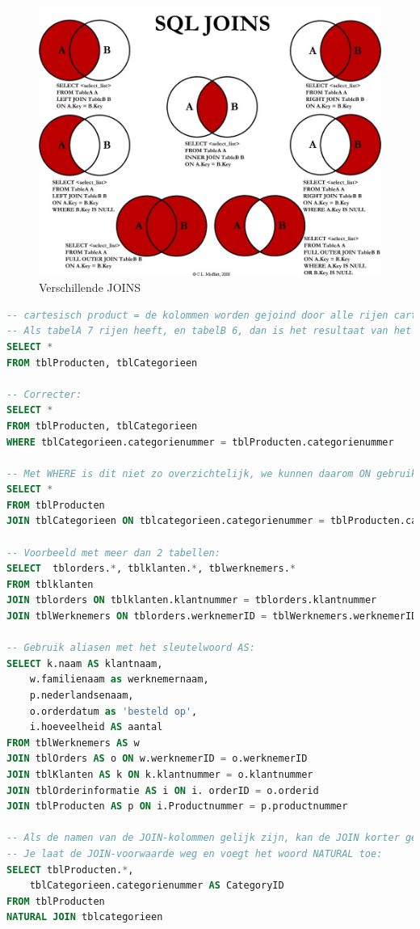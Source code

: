 \documentclass{article}
\begin{document}
\begin{figure}[H]
    \centering
    \includegraphics[width=\textwidth]{SQL Joins.jpg}
    \caption{Verschillende JOINS}
\end{figure}

\begin{lstlisting}[language=SQL]
-- cartesisch product = de kolommen worden gejoind door alle rijen cartesisch te combineren
-- Als tabelA 7 rijen heeft, en tabelB 6, dan is het resultaat van het cartesisch product 42 rijen (7*6):
SELECT *
FROM tblProducten, tblCategorieen 

-- Correcter:
SELECT *
FROM tblProducten, tblCategorieen
WHERE tblCategorieen.categorienummer = tblProducten.categorienummer

-- Met WHERE is dit niet zo overzichtelijk, we kunnen daarom ON gebruiken:
SELECT *
FROM tblProducten
JOIN tblCategorieen ON tblcategorieen.categorienummer = tblProducten.categorienummer

-- Voorbeeld met meer dan 2 tabellen:
SELECT  tblorders.*, tblklanten.*, tblwerknemers.* 
FROM tblklanten
JOIN tblorders ON tblklanten.klantnummer = tblorders.klantnummer
JOIN tblWerknemers ON tblorders.werknemerID = tblWerknemers.werknemerID

-- Gebruik aliasen met het sleutelwoord AS:
SELECT k.naam AS klantnaam, 
    w.familienaam as werknemernaam, 
    p.nederlandsenaam, 
    o.orderdatum as 'besteld op', 
    i.hoeveelheid AS aantal
FROM tblWerknemers AS w 
JOIN tblOrders AS o ON w.werknemerID = o.werknemerID 
JOIN tblKlanten AS k ON k.klantnummer = o.klantnummer
JOIN tblOrderinformatie AS i ON i. orderID = o.orderid
JOIN tblProducten AS p ON i.Productnummer = p.productnummer

-- Als de namen van de JOIN-kolommen gelijk zijn, kan de JOIN korter geschreven worden.
-- Je laat de JOIN-voorwaarde weg en voegt het woord NATURAL toe:
SELECT tblProducten.*, 
    tblCategorieen.categorienummer AS CategoryID
FROM tblProducten
NATURAL JOIN tblcategorieen
    
\end{lstlisting}
\end{document}
